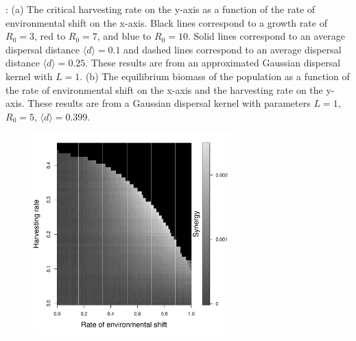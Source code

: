 \documentclass[12pt,english]{article}
\begin{document}
\begin{figure}[htbp]
\caption{%
}

\label{baseline}
\end{figure}

\pagebreak

: (a) The critical harvesting rate on the y-axis as a function of the rate of environmental shift on the x-axis.  Black lines correspond to a growth rate of $R_0=3$, red to $R_0=7$, and blue to $R_0=10$.  Solid lines correspond to an average dispersal distance $\langle d \rangle =0.1$ and dashed lines correspond to an average dispersal distance $\langle d \rangle =0.25$.  These results are from an approximated Gaussian dispersal kernel with $L=1$.  (b) 
The equilibrium biomass of the population as a function of the rate of environmental shift on the x-axis and the harvesting rate on the y-axis. These results are from a Gaussian dispersal kernel with parameters $L=1$, $R_0=5$, $\langle d \rangle = 0.399$. 


\pagebreak

\begin{figure}[htbp]
\begin{center}
\includegraphics[width=3in]{plots/synergy.pdf}
\caption{
}
\label{Synergy}
\end{center}
\end{figure}
\end{document}
